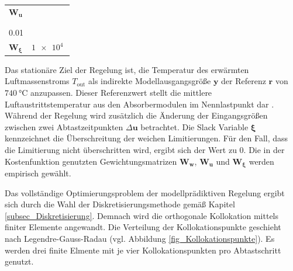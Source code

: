 \begin{table}[ht!]
\begin{tabular}{>{\centering\arraybackslash}m{}>{\centering\arraybackslash}m{}}
$\boldsymbol{W_u}$           & \[\arraycolsep=0pt\def\arraystretch{1.2} \left(\begin{array}{c} 10 \\ 10 \\ 10 \\ \SI{0.01}{} \end{array}\right) \]                                                                  \\[-0.5cm]
$\boldsymbol{W_{\xi}}$       & $\SI{1e4}{}$                                                                                                                                                                         \\
        \toprule
    \end{tabular}
    \label{tab_Kostenfunktion}
\end{table}
\endgroup


Das stationäre Ziel der Regelung ist, die Temperatur des erwärmten Luftmassenstroms $T_{\mathrm{out}}$ als indirekte Modellausgangsgröße $\boldsymbol{y}$ der Referenz $\boldsymbol{r}$ von $\SI{740}{\celsius}$ anzupassen.
Dieser Referenzwert stellt die mittlere Luftaustrittstemperatur aus den Absorbermodulen im Nennlastpunkt dar \cite[\S.29]{HandbuchJülich}.
Während der Regelung wird zusätzlich die Änderung der Eingangsgrößen zwischen zwei Abtastzeitpunkten $\Delta \boldsymbol{u}$ betrachtet.
Die Slack Variable $\boldsymbol{\xi}$ kennzeichnet die Überschreitung der weichen Limitierungen.
Für den Fall, dass die Limitierung nicht überschritten wird, ergibt sich der Wert zu 0.
Die in der Kostenfunktion genutzten Gewichtungsmatrizen $\boldsymbol{W_w}$, $\boldsymbol{W_u}$ und $\boldsymbol{W_{\xi}}$ werden empirisch gewählt.


Das vollständige Optimierungsproblem der modellprädiktiven Regelung ergibt sich durch die Wahl der Diskretisierungsmethode gemäß Kapitel \ref{subsec_Diskretisierung}.
Demnach wird die orthogonale Kollokation mittels finiter Elemente angewandt.
Die Verteilung der Kollokationspunkte geschieht nach Legendre-Gauss-Radau (vgl. Abbildung \ref{fig_Kollokationspunkte}).
Es werden drei finite Elmente mit je vier Kollokationspunkten pro Abtastschritt genutzt.

